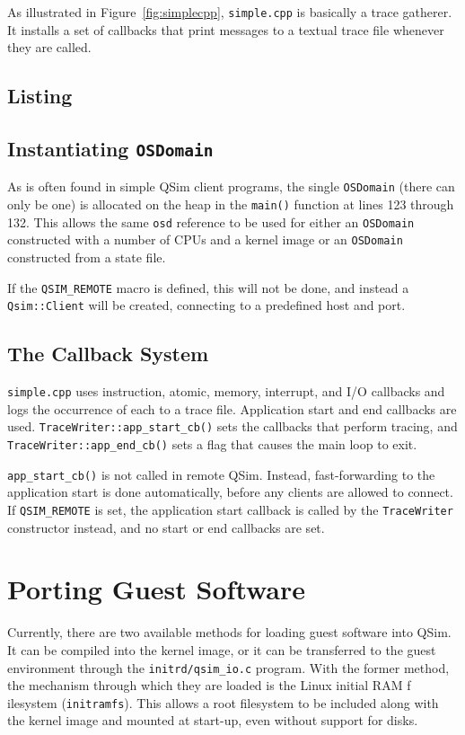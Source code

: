\documentclass[letterpaper, 10pt]{book}
\begin{document}
As illustrated in Figure~\ref{fig:simplecpp}, \texttt{simple.cpp} is basically a
trace gatherer. It installs a set of callbacks that print messages to a textual
trace file whenever they are called.

\section{Listing}


\section{Instantiating \texttt{OSDomain}}
As is often found in simple QSim client programs, the single \texttt{OSDomain}
(there can only be one) is allocated on the heap in the \texttt{main()}
function at lines 123 through 132. This allows the same \texttt{osd} reference
to be used for either an \texttt{OSDomain} constructed with a number of CPUs and
a kernel image or an \texttt{OSDomain} constructed from a state file.

If the \texttt{QSIM\_REMOTE} macro is defined, this will not be done, and
instead a \texttt{Qsim::Client} will be created, connecting to a predefined
host and port.

\section{The Callback System}

\texttt{simple.cpp} uses instruction, atomic, memory, interrupt, and I/O
callbacks and logs the occurrence of each to a trace file. Application start
and end callbacks are used. \texttt{TraceWriter::app\_start\_cb()} sets the
callbacks that perform tracing, and \texttt{TraceWriter::app\_end\_cb()}
sets a flag that causes the main loop to exit.

\texttt{app\_start\_cb()} is not called in remote QSim. Instead, fast-forwarding
to the application start is done automatically, before any clients are allowed
to connect. If \texttt{QSIM\_REMOTE} is set, the application start callback is
called by the \texttt{TraceWriter} constructor instead, and no start or end
callbacks are set.

\chapter{Porting Guest Software} \label{chap:porting}
Currently, there are two available methods for loading guest software into QSim.
It can be compiled into the kernel image, or it can be transferred to the guest
environment through the \texttt{initrd/qsim\_io.c} program. With the former 
method, the mechanism through which they are loaded is the Linux initial RAM f
ilesystem (\texttt{initramfs}). This allows a root filesystem to be included
along with the kernel image and mounted at start-up, even without support for
disks.
\end{document}
